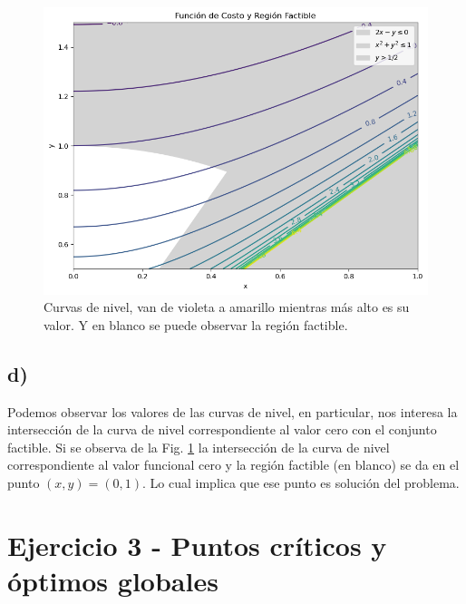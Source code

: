 \documentclass[10pt,a4paper]{report}
\begin{document}
	\begin{figure}[!ht]
		\centering
		\includegraphics[width=1\textwidth]{ej2-2.png}
		\caption{Curvas de nivel, van de violeta a amarillo mientras más alto es su valor. Y en blanco se puede observar la región factible.}
		\label{ej2-2}
	\end{figure}
	
	\FloatBarrier 
	
	\subsection*{d) }
	
	Podemos observar los valores de las curvas de nivel, en particular, nos interesa la intersección de la curva de nivel correspondiente al valor cero con el conjunto factible. Si se observa de la Fig. \ref{ej2-2} la intersección de la curva de nivel correspondiente al valor funcional cero y la región factible (en blanco) se da en el punto $(x,y) = (0,1)$. Lo cual implica que ese punto es solución del problema.
	

\section*{Ejercicio 3 - Puntos críticos y óptimos globales}


	
	
\end{document}

